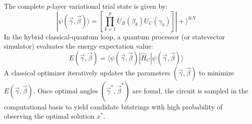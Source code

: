 The complete $p$-layer variational trial state is given by:
\begin{equation}
\label{eq:qaoa_state}
|\psi(\vec{\gamma}, \vec{\beta})\rangle = \left[ \prod_{k=1}^p U_B(\beta_k) U_C(\gamma_k) \right] |+\rangle^{\otimes N}
\end{equation}
In the hybrid classical-quantum loop, a quantum processor (or statevector simulator) evaluates the energy expectation value:
\begin{equation}
E(\vec{\gamma}, \vec{\beta}) = \langle \psi(\vec{\gamma}, \vec{\beta}) | \hat{H}_C | \psi(\vec{\gamma}, \vec{\beta}) \rangle
\end{equation}
A classical optimizer iteratively updates the parameters $(\vec{\gamma}, \vec{\beta})$ to minimize $E(\vec{\gamma}, \vec{\beta})$. Once optimal angles $(\vec{\gamma}^*, \vec{\beta}^*)$ are found, the circuit is sampled in the computational basis to yield candidate bitstrings with high probability of observing the optimal solution $x^*$.
